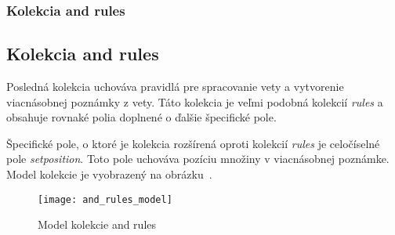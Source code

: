%
%
{
	\subsubsection{Kolekcia and rules}
}
{
	\subsection{Kolekcia and rules}
}
\label{subsubsection:collection_and_rules}
Posledná kolekcia uchováva pravidlá pre spracovanie vety a vytvorenie viacnásobnej poznámky z vety. Táto kolekcia je veľmi podobná kolekcií \textit{rules} a obsahuje rovnaké polia doplnené o ďalšie špecifické pole.

Špecifické pole, o ktoré je kolekcia rozšírená oproti kolekcií \textit{rules} je celočíselné pole \textit{set\textunderscore position}. Toto pole uchováva pozíciu množiny v viacnásobnej poznámke. Model kolekcie je vyobrazený na obrázku~.

\begin{figure}[H]
	\begin{center}\texttt{[image: and\_rules\_model]}\end{center}
	\caption[Model kolekcie and rules]{Model kolekcie and rules}\label{fig:and_rules_collection_model}
\end{figure}


